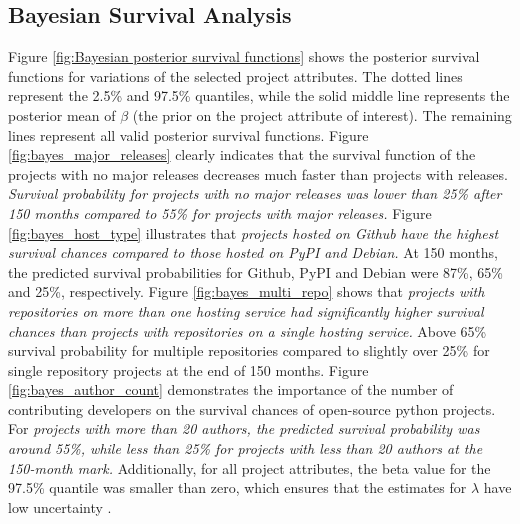 \documentclass[sigconf]{acmart}
\begin{document}
\subsection{Bayesian Survival Analysis} \label{bayes-results}

Figure \ref{fig:Bayesian posterior survival functions} shows the posterior survival functions for variations of the selected project attributes. 
The dotted lines represent the  2.5\% and 97.5\% quantiles, while the solid middle line represents the posterior mean of $\beta$ (the prior on the project attribute of interest). 
The remaining lines represent all valid posterior survival functions. 
Figure \ref{fig:bayes_major_releases} clearly indicates that the survival function of the projects with no major releases decreases much faster than projects with releases. 
\emph{Survival probability for projects with no major releases was lower than 25\% after 150 months compared to 55\% for projects with major releases.}
Figure \ref{fig:bayes_host_type} illustrates that \emph{projects hosted on Github have the highest survival chances compared to those hosted on PyPI and Debian.} 
At 150 months, the predicted survival probabilities for Github, PyPI and Debian were 87\%, 65\% and 25\%, respectively.
Figure \ref{fig:bayes_multi_repo} shows that \emph{projects with repositories on more than one hosting service had significantly higher survival chances than projects with repositories on a single hosting service.}
Above 65\% survival probability for multiple repositories compared to slightly over 25\% for single repository projects at the end of 150 months.
Figure \ref{fig:bayes_author_count} demonstrates the importance of the number of contributing developers on the survival chances of open-source python projects. 
For \emph{projects with more than 20 authors, the predicted survival probability was around 55\%, while less than 25\% for projects with less than 20 authors at the 150-month mark.}
Additionally, for all project attributes, the beta value for the 97.5\% quantile was smaller than zero, which ensures that the estimates for $\lambda$ have low uncertainty \cite{kelter2020bayesian}.
\end{document}
